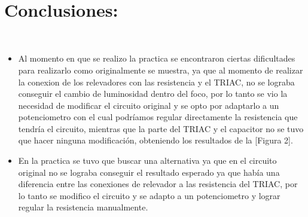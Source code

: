 \documentclass[12pt,letterpaper]{article}
\begin{document}
\
\section{Conclusiones:}
\
\begin{itemize}

\item Al momento en que se realizo la practica se encontraron ciertas dificultades para realizarlo como originalmente se muestra, ya que al momento de realizar la conexion de los relevadores con las resistencia y el TRIAC, no se lograba conseguir el cambio de luminosidad dentro del foco, por lo tanto se vio la necesidad de modificar el circuito original y se opto por adaptarlo a un potenciometro con el cual podríamos regular directamente la resistencia que tendría el circuito, mientras que la parte del TRIAC y el capacitor no se tuvo que hacer ninguna modificación, obteniendo los resultados de la [Figura 2].
\item En la practica se tuvo que buscar una alternativa ya que en el circuito original no se lograba conseguir el resultado esperado ya que había una diferencia entre las conexiones de relevador a las resistencia del TRIAC, por lo tanto se modifico el circuito y se adapto a un potenciometro y lograr regular la resistencia manualmente.
\end{itemize}
\end{document}
